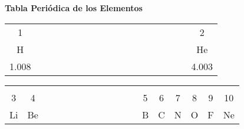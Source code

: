 \documentclass[10pt,landscape]{article}
\begin{document}
\thispagestyle{empty}
\Large
\begin{center}
    \textcolor[rgb]{0.15,0.15,0.55}{{\huge \bf \sc \hspace{-1cm} Tabla Periódica de los Elementos}\\[-0.3cm]}
    \begin{tabular}{|c|p{10.7mm}*{14}{p{9.86mm}}p{12.2mm}|c|}
        \cline{1-1}\cline{18-18}
        {\small 1}                                &  &  &  &  &  &  &  &  &  &  &  &  &  &  &  &  & \small 2                                   \\[-1mm]
        H                                         &  &  &  &  &  &  &  &  &  &  &  &  &  &  &  &  & He                                         \\[-2mm]
        \small \hspace{1.6mm}1.008\hspace{1.65mm} &  &  &  &  &  &  &  &  &  &  &  &  &  &  &  &  & \small \hspace{1.55mm}4.003\hspace{2.25mm} \\\cline{1-2}\cline{13-18}
    \end{tabular}
    \begin{tabular}{|c|c|p{17.8mm}*{9}{p{8.98mm}}|c|c|c|c|c|c|}
                                                   &                                             &  &  &  &  &  &  &  &  &  &  &                                            &                                             &                                           &               &                                           &               \\[-6.6mm]
        \small 3                                   & \small 4                                    &  &  &  &  &  &  &  &  &  &  & \small 5                                   & \small 6                                    & \small 7                                  & \small 8      & \small 9                                  & \small 10     \\[-1mm]
        Li                                         & Be                                          &  &  &  &  &  &  &  &  &  &  & B                                          & C                                           & N                                         & O             & F                                         & Ne            \\[-2mm]

\end{tabular}
\end{center}
\end{document}
